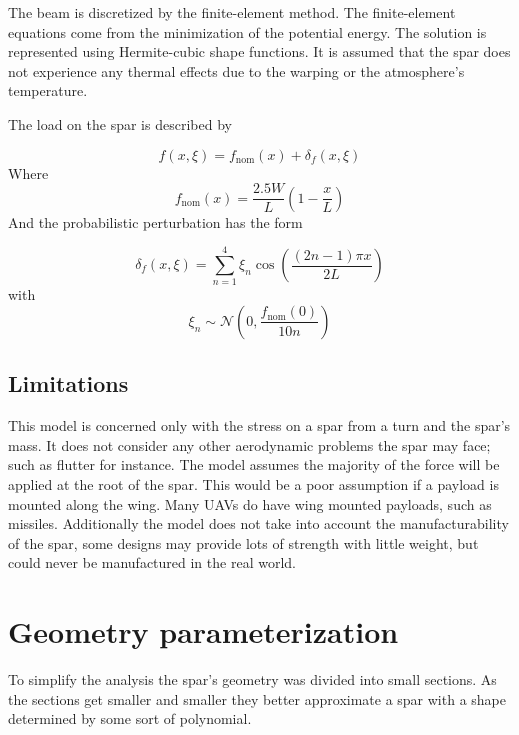 \documentclass[12pt]{article}
\begin{document}
	The beam is discretized by the finite-element method. The finite-element equations come from the minimization of the potential energy. The solution is represented using Hermite-cubic shape functions. It is assumed that the spar does not experience any thermal effects due to the warping or the atmosphere's temperature. 
	
	The load on the spar is described by 
	
	\begin{equation}
	f ( x , \xi ) = f _ { \mathrm { nom } } ( x ) + \delta _ { f } ( x , \xi )
	\end{equation}
	Where 
	\begin{equation}
	f _ { \mathrm { nom } } ( x ) = \frac { 2.5 W } { L } \left( 1 - \frac { x } { L } \right)
	\end{equation}
	And the probabilistic perturbation has the form
	
	\begin{equation}
	\delta _ { f } ( x , \xi ) = \sum _ { n = 1 } ^ { 4 } \xi _ { n } \cos \left( \frac { ( 2 n - 1 ) \pi x } { 2 L } \right)
	\end{equation}
	with
	\begin{equation}
	\xi _ { n } \sim \mathcal { N } \left( 0 , \frac { f _ { \mathrm { nom } } ( 0 ) } { 10 n } \right)
	\end{equation}
	
	
	
	
	\subsection{Limitations}
	This model is concerned only with the stress on a spar from a turn and the spar's mass. It does not consider any other aerodynamic problems the spar may face; such as flutter for instance. The model assumes the majority of the force will be applied at the root of the spar. This would be a poor assumption if a payload is mounted along the wing. Many UAVs do have wing mounted payloads, such as missiles.  Additionally the model does not take into account the manufacturability of the spar, some designs may provide lots of strength with little weight, but could never be manufactured in the real world. 
	

	\section{Geometry parameterization}
	
	To simplify the analysis the spar's geometry was divided into small sections. As the sections get smaller and smaller they better approximate a spar with a shape determined by some sort of polynomial. 
	
\end{document}
